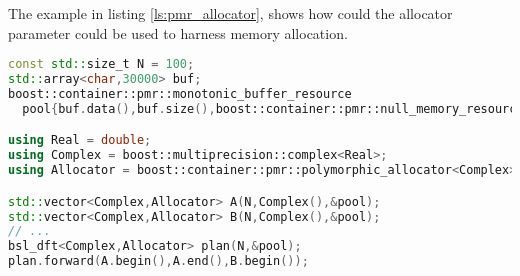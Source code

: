 The example in listing \ref{ls:pmr_allocator}, shows how could the allocator
parameter could be used to harness memory allocation.

\begin{lstlisting}[language=C++,caption=Example use of custom allocators.,label=ls:pmr_allocator]
const std::size_t N = 100;
std::array<char,30000> buf;
boost::container::pmr::monotonic_buffer_resource
  pool{buf.data(),buf.size(),boost::container::pmr::null_memory_resource()};

using Real = double;
using Complex = boost::multiprecision::complex<Real>;
using Allocator = boost::container::pmr::polymorphic_allocator<Complex>;

std::vector<Complex,Allocator> A(N,Complex(),&pool);
std::vector<Complex,Allocator> B(N,Complex(),&pool);
// ...
bsl_dft<Complex,Allocator> plan(N,&pool);
plan.forward(A.begin(),A.end(),B.begin());
\end{lstlisting}
